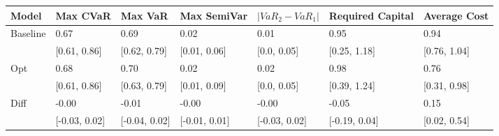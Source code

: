 \begin{tabular}{lllllll}
\toprule
   Model &      Max CVaR &       Max VaR &   Max SemiVar & $|VaR_2 - VaR_1|$ & Required Capital & Average Cost \\
\midrule
Baseline &          0.67 &          0.69 &          0.02 &              0.01 &             0.95 &         0.94 \\
         &  [0.61, 0.86] &  [0.62, 0.79] &  [0.01, 0.06] &       [0.0, 0.05] &     [0.25, 1.18] & [0.76, 1.04] \\
     Opt &          0.68 &          0.70 &          0.02 &              0.02 &             0.98 &         0.76 \\
         &  [0.61, 0.86] &  [0.63, 0.79] &  [0.01, 0.09] &       [0.0, 0.05] &     [0.39, 1.24] & [0.31, 0.98] \\
    Diff &         -0.00 &         -0.01 &         -0.00 &             -0.00 &            -0.05 &         0.15 \\
         & [-0.03, 0.02] & [-0.04, 0.02] & [-0.01, 0.01] &     [-0.03, 0.02] &    [-0.19, 0.04] & [0.02, 0.54] \\
\bottomrule
\end{tabular}
